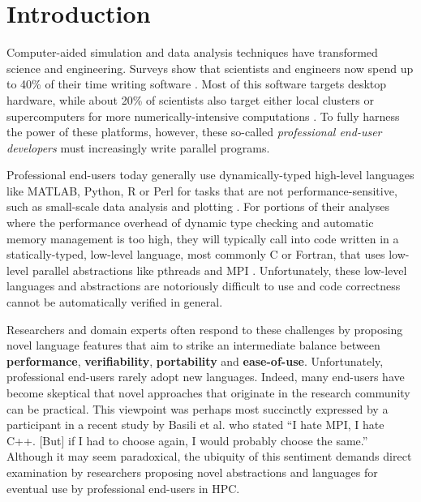 \documentclass{sig-alternate}
\begin{document}


%



\section{Introduction}

Computer-aided simulation and data analysis techniques have transformed science and engineering. Surveys show that scientists and engineers now spend up to 40\% of their time writing software \cite{howison2011scientific, hannay2009scientists}. Most of this software targets desktop hardware, while about 20\% of scientists also target either local clusters or super\-computers for more numerically-intensive computations \cite{hannay2009scientists}. To fully harness the power of these platforms, however, these so-called {\em professional end-user developers} \cite{segal2007some} must increasingly write parallel programs.

Professional end-users today generally use dynamically-typed high-level languages like MATLAB, Python, R or Perl for tasks that are not performance-sensitive, such as small-scale data analysis and plotting \cite{nguyen2010survey}. For portions of their analyses where the performance overhead of dynamic type checking and automatic memory management is too high, they will typically call into code written in a statically-typed, low-level language, most commonly C or Fortran, that uses low-level parallel abstractions like pthreads and MPI \cite{4222616,basili2008understanding}. Unfortunately, these low-level languages and abstractions are notoriously difficult to use and code correctness cannot be automatically verified in general.

Researchers and domain experts often respond to these challenges by proposing novel language features that aim to strike an intermediate balance between \textbf{performance}, \textbf{verifiability\-}, \textbf{portability} and \textbf{ease-of-use}.
Unfortunately, professional end-users rarely adopt new languages. Indeed, many end-users have become skeptical that novel approaches that originate in the research community can be  practical. This viewpoint was perhaps most succinctly expressed by a participant in a recent study by Basili et al. \cite{basili2008understanding} who stated ``I hate MPI, I hate C++. [But] if I had to choose again, I would probably choose the same.'' Although it may seem paradoxical, the ubiquity of this sentiment demands direct examination by researchers proposing novel abstractions and languages for eventual use by professional end-users in HPC.
\end{document}
